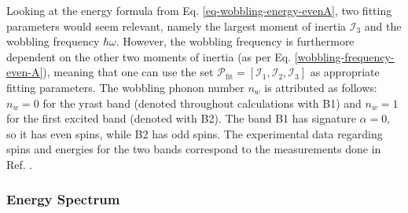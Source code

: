 Looking at the energy formula from Eq. \ref{eq-wobbling-energy-evenA}, two fitting parameters would seem relevant, namely the largest moment of inertia $\mathcal{I}_3$ and the wobbling frequency $\hbar\omega$. However, the wobbling frequency is furthermore dependent on the other two moments of inertia (as per Eq. \ref{wobbling-frequency-even-A}), meaning that one can use the set $\mathcal{P}_\text{fit}=\left[\mathcal{I}_1,\mathcal{I}_2,\mathcal{I}_3\right]$ as appropriate fitting parameters. The wobbling phonon number $n_w$ is attributed as follows: $n_w=0$ for the yrast band (denoted throughout calculations with B1) and $n_w=1$ for the first excited band (denoted with B2). The band B1 has signature $\alpha=0$, so it has even spins, while B2 has odd spins. The experimental data regarding spins and energies for the two bands correspond to the measurements done in Ref. \cite{petrache2019diversity}.

\subsubsection{Energy Spectrum}

